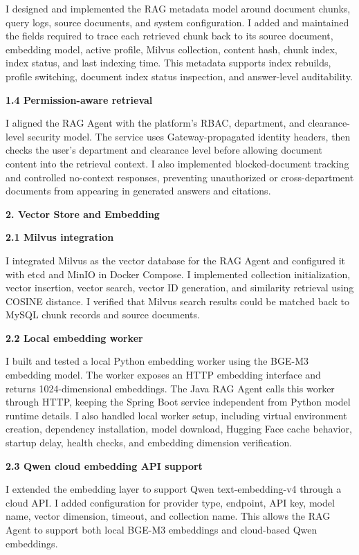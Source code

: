 I designed and implemented the RAG metadata model around document chunks, query logs, source documents, and system configuration. I added and maintained the fields required to trace each retrieved chunk back to its source document, embedding model, active profile, Milvus collection, content hash, chunk index, index status, and last indexing time. This metadata supports index rebuilds, profile switching, document index status inspection, and answer-level auditability.

\textbf{1.4 Permission-aware retrieval}

I aligned the RAG Agent with the platform’s RBAC, department, and clearance-level security model. The service uses Gateway-propagated identity headers, then checks the user's department and clearance level before allowing document content into the retrieval context. I also implemented blocked-document tracking and controlled no-context responses, preventing unauthorized or cross-department documents from appearing in generated answers and citations.

\textbf{2. Vector Store and Embedding}

\textbf{2.1 Milvus integration}

I integrated Milvus as the vector database for the RAG Agent and configured it with etcd and MinIO in Docker Compose. I implemented collection initialization, vector insertion, vector search, vector ID generation, and similarity retrieval using COSINE distance. I verified that Milvus search results could be matched back to MySQL chunk records and source documents.

\textbf{2.2 Local embedding worker}

I built and tested a local Python embedding worker using the BGE-M3 embedding model. The worker exposes an HTTP embedding interface and returns 1024-dimensional embeddings. The Java RAG Agent calls this worker through HTTP, keeping the Spring Boot service independent from Python model runtime details. I also handled local worker setup, including virtual environment creation, dependency installation, model download, Hugging Face cache behavior, startup delay, health checks, and embedding dimension verification.

\textbf{2.3 Qwen cloud embedding API support}

I extended the embedding layer to support Qwen text-embedding-v4 through a cloud API. I added configuration for provider type, endpoint, API key, model name, vector dimension, timeout, and collection name. This allows the RAG Agent to support both local BGE-M3 embeddings and cloud-based Qwen embeddings.

